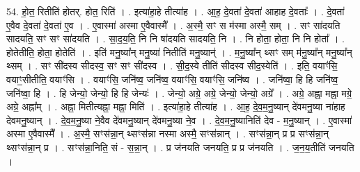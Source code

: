 \documentclass[17pt]{extarticle}
\begin{document}
54. हो॒त॒ रितीति॑ होतर्. होत॒ रिति॑ । . इत्या॑हा॒हे तीत्या॑ह । . आ॒ह॒ दे॒वता॑ दे॒वता॑ आहाह दे॒वताः᳚ । . दे॒वता॑ ए॒वैव दे॒वता॑ दे॒वता॑ ए॒व । . ए॒वास्मा॑ अस्मा ए॒वैवास्मै᳚ । . अ॒स्मै॒ सꣳ स म॑स्मा अस्मै॒ सम् । . सꣳ सा॑दयति सादयति॒ सꣳ सꣳ सा॑दयति । . सा॒द॒य॒ति॒ नि नि षा॑दयति सादयति॒ नि । . नि होता॒ होता॒ नि नि होता᳚ । . होतेतीति॒ होता॒ होतेति॑ । . इति॑ मनु॒ष्या᳚न् मनु॒ष्या॑ नितीति॑ मनु॒ष्यान्॑ । . म॒नु॒ष्या᳚न् थ्सꣳ सम् म॑नु॒ष्या᳚न् मनु॒ष्या᳚न् थ्सम् । . सꣳ सी॑दस्व सीदस्व॒ सꣳ सꣳ सी॑दस्व । . सी॒द॒स्वे तीति॑ सीदस्व सीद॒स्वेति॑ । . इति॒ वयाꣳ॑सि॒ वयाꣳ॒॒सीतीति॒ वयाꣳ॑सि । . वयाꣳ॑सि॒ जनि॑ष्व॒ जनि॑ष्व॒ वयाꣳ॑सि॒ वयाꣳ॑सि॒ जनि॑ष्व । . जनि॑ष्वा॒ हि हि जनि॑ष्व॒ जनि॑ष्वा॒ हि । . हि जेन्यो॒ जेन्यो॒ हि हि जेन्यः॑ । . जेन्यो॒ अग्रे॒ अग्रे॒ जेन्यो॒ जेन्यो॒ अग्रे᳚ । . अग्रे॒ अह्ना॒ मह्ना॒ मग्रे॒ अग्रे॒ अह्ना᳚म् । . अह्ना॒ मितीत्यह्ना॒ मह्ना॒ मिति॑ । . इत्या॑हा॒हे तीत्या॑ह । . आ॒ह॒ दे॒व॒म॒नु॒ष्यान् दे॑वमनु॒ष्या ना॑हाह देवमनु॒ष्यान् । . दे॒व॒म॒नु॒ष्या ने॒वैव दे॑वमनु॒ष्यान् दे॑वमनु॒ष्या ने॒व । . दे॒व॒म॒नु॒ष्यानिति॑ देव - म॒नु॒ष्यान् । . ए॒वास्मा॑ अस्मा ए॒वैवास्मै᳚ । . अ॒स्मै॒ सꣳस॑न्ना॒न् थ्सꣳस॑न्ना नस्मा अस्मै॒ सꣳस॑न्नान् । . सꣳस॑न्ना॒न् प्र प्र सꣳस॑न्ना॒न् थ्सꣳस॑न्ना॒न् प्र । . सꣳस॑न्ना॒निति॒ सं - स॒न्ना॒न् । . प्र ज॑नयति जनयति॒ प्र प्र ज॑नयति । . ज॒न॒य॒तीति॑ जनयति । \newline
\end{document}
